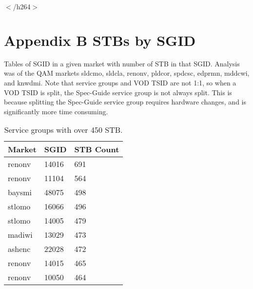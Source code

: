 \documentclass{article}
\begin{document}
$<$/h264$>$



\newpage

\section{Appendix B\: STBs by SGID}
\label{APPENDIX-CustBySGID}

Tables of SGID in a given market with number of STB in that SGID. Analysis was of the QAM markets sldcmo, sldcla, renonv, pldcor, spdcsc, edprmn, mddcwi, and knwdmi. Note that service groups and VOD TSID are not 1:1, so when a VOD TSID is split, the Spec-Guide service group is not always split. This is because splitting the Spec-Guide service group requires hardware changes, and is significantly more time consuming. 

\begin{table}[h]
\centering
\begin{tabular}{|l|l|l|} 
\hline Market & SGID & STB Count \\
\hline renonv & 14016 & 691 \\  
\hline renonv & 11104 & 564 \\
\hline baysmi & 48075 & 498 \\
\hline stlomo & 16066 & 496 \\
\hline stlomo & 14005 & 479 \\
\hline madiwi & 13029 & 473 \\
\hline ashenc & 22028 & 472 \\
\hline renonv & 14015 & 465 \\
\hline renonv & 10050 & 464 \\
\hline
\end{tabular}
\caption{\label{TABLE-HighSGUse} Service groups with over 450 STB.} 
\end{table}
\end{document}
